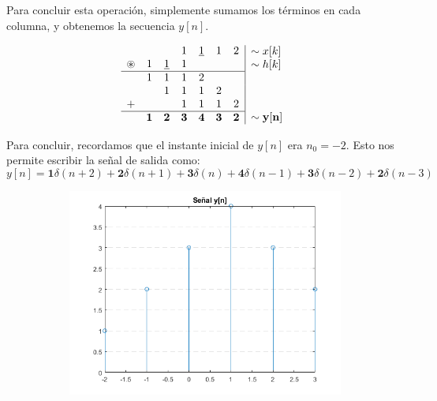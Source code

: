 \documentclass[a4paper]{book}
\begin{document}
\begin{enumerate}
Para concluir esta operación, simplemente sumamos los términos en cada columna, y obtenemos la secuencia $y[n]$.

\[ \begin{array}{ccccccc}
&            &               & 1          & \underline{1} & 1          & 2          \\
\circledast & 1          & \underline{1} & 1          &               &            &            \\
\hline
& 1          & 1             & 1          & 2             &            &            \\
&            & 1             & 1          & 1             & 2          &            \\
+           &            &               & 1          & 1             & 1          & 2          \\
\hline
& \mathbf{1} & \mathbf{2}    & \mathbf{3} & \mathbf{4}    & \mathbf{3} & \mathbf{2} \\
\end{array}
\begin{array}{|l}
\sim x[k]   \\
\sim h[k]   \\
\phantom{a} \\
\phantom{a} \\
\phantom{a} \\
\mathbf{\sim y[n]}
\end{array}\]
\end{enumerate}

Para concluir, recordamos que el instante inicial de $y[n]$ era $n_0=-2$. Esto nos permite escribir la señal de salida como: \[y[n] = \mathbf{1}\delta (n+2) + \mathbf{2}\delta (n+1) + \mathbf{3}\delta (n) + \mathbf{4}\delta (n-1) + \mathbf{3}\delta (n-2) + \mathbf{2}\delta (n-3)\]

\begin{figure}[!ht]
\caption{}
\label{fig:Problema_2_c}
\centering
\begin{subfigure}[b]{0.7\linewidth}
\includegraphics[width=\linewidth]{./Imágenes/aaq.png}
\end{subfigure}
\end{figure}
\end{document}

